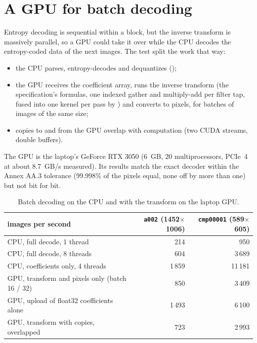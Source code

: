\section{A GPU for batch decoding}
\label{sec:gpu}

Entropy decoding is sequential within a block, but the inverse transform is massively
parallel, so a GPU could take it over while the CPU decodes the entropy-coded data of the next
images. The test split the work that way:
\begin{itemize}
  \item the CPU parses, entropy-decodes and dequantizes ();
  \item the GPU receives the coefficient array, runs the inverse transform (the specification's
    formulas, one indexed gather and multiply-add per filter tap, fused into one kernel per pass
    by ) and converts to pixels, for batches of images of the same size;
  \item copies to and from the GPU overlap with computation (two CUDA streams, double buffers).
\end{itemize}
The GPU is the laptop's GeForce RTX 3050 (6~GB, 20 multiprocessors, PCIe~4 at about
8.7~GB/s measured). Its results match the exact decoder within the Annex AA.3 tolerance
(99.998\% of the pixels equal, none off by more than one) but not bit for bit.

\begin{table}[ht]
  \centering\small
  \begin{tabular}{@{}lrr@{}}
    \toprule
    images per second & \texttt{a002} (1452$\times$1006) & \texttt{cmp00001} (589$\times$605) \\
    \midrule
    CPU, full decode, 1 thread & 214 & 950 \\
    CPU, full decode, 8 threads & 604 & 3\,689 \\
    CPU, coefficients only, 4 threads & 1\,859 & 11\,181 \\
    GPU, transform and pixels only (batch 16 / 32) & 850 & 3\,409 \\
    GPU, upload of float32 coefficients alone & 1\,493 & 6\,100 \\
    GPU, transform with copies, overlapped & 723 & 2\,993 \\
    \bottomrule
  \end{tabular}
  \caption{Batch decoding on the CPU and with the transform on the laptop GPU.}
  \label{tab:gpu}
\end{table}

